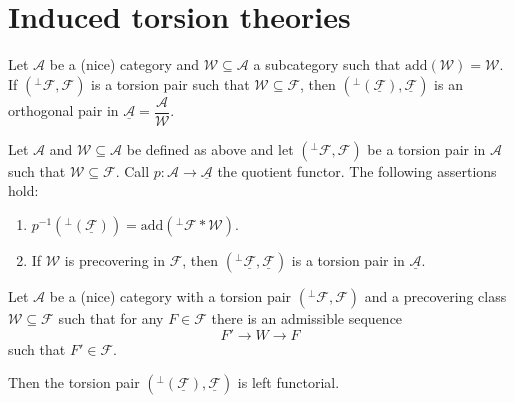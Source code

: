 \clearpage

\section{Induced torsion theories}

\begin{lemma}
  Let $\mathcal{A}$ be a (nice) category and $\mathcal{W}\subseteq\mathcal{A}$ a subcategory
  such that $\mathrm{add}(\mathcal{W})=\mathcal{W}$. If $(^\perp\mathcal{F},\mathcal{F})$ is a torsion pair
  such that $\mathcal{W}\subseteq \mathcal{F}$, then $(^\perp(\underline{\mathcal{F}}),\underline{\mathcal{F}})$
  is an orthogonal pair in $\underline{\mathcal{A}}=\dfrac{\mathcal{A}}{\mathcal{W}}$.
\end{lemma}

\begin{lemma}\label{lem:notes:3}
  Let $\mathcal{A}$ and $\mathcal{W}\subseteq\mathcal{A}$ be defined as above and let
  $(^\perp\mathcal{F},\mathcal{F})$ be a torsion pair in $\mathcal{A}$ such that $\mathcal{W}\subseteq\mathcal{F}$.
  Call $p:\mathcal{A}\to \underline{\mathcal{A}}$ the quotient functor.
  The following assertions hold:
  \begin{enumerate}
    \item $p^{-1}(^\perp(\underline{\mathcal{F}}))=\mathrm{add}(^\perp\mathcal{F}\ast\mathcal{W})$.
    \item If $\mathcal{W}$ is precovering in $\mathcal{F}$, then $(^\perp\underline{\mathcal{F}},\underline{\mathcal{F}})$
    is a torsion pair in $\underline{\mathcal{A}}$.
  \end{enumerate}
\end{lemma}

\begin{lemma}
  Let $\mathcal{A}$ be a (nice) category with a torsion pair $(^\perp\mathcal{F}, \mathcal{F})$ and a precovering class
  $\mathcal{W}\subseteq \mathcal{F}$ such that for any $F\in\mathcal{F}$ there is an admissible
  sequence
  \begin{equation*}
    F'\to W\to F
  \end{equation*}
  such that $F'\in\mathcal{F}$.

  Then the torsion pair $(^\perp(\underline{\mathcal{F}}),\underline{\mathcal{F}})$ is left functorial.
\end{lemma}

